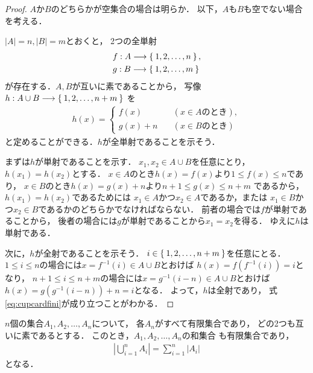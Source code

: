    \begin{proof}
     $A$か$B$のどちらかが空集合の場合は明らか．
     以下，$A$も$B$も空でない場合を考える．

     $\lvert A \rvert = n ,  \lvert B \rvert =m$とおくと，
     2つの全単射
     \begin{align*}
       & f : A \longrightarrow \Set{ 1,  2,  \ldots ,  n} ,\\
       & g : B \longrightarrow \Set{ 1,  2,  \ldots ,  m}
     \end{align*}
     が存在する．$A,B$が互いに素であることから，
     写像$h: A \cup B \longrightarrow \Set{ 1,  2,  \ldots ,  n+m} $
     を
     \begin{align*}
       h (x) = \left \{ 
         \begin{aligned}
           f(x)  \qquad & (x \in A \text{のとき} ) , \\
           g(x)+n  \quad & ( x \in B \text{のとき} )
         \end{aligned}
         \right.
     \end{align*}
     と定めることができる．$h$が全単射であることを示そう．
     
     まずは$h$が単射であることを示す．
     $x_1 , x_2 \in A \cup B$を任意にとり，$h(x_1)=h(x_2)$とする．
     $x \in A$のとき$h(x) = f(x)$より$1 \leq f(x) \leq n$であり，
     $x \in B$のとき$h(x) = g(x) + n$より$n+1 \leq g(x) \leq n+m$
     であるから，$h(x_1)=h(x_2)$であるためには
     $x_1 \in A$かつ$x_2 \in A$であるか，または
     $x_1 \in B$かつ$x_2 \in B$であるかのどちらかでなければならない．
     前者の場合では$f$が単射であることから，
     後者の場合には$g$が単射であることから$x_1=x_2$を得る．
     ゆえに$h$は単射である．

     次に，$h$が全射であることを示そう．
     $i \in \Set{ 1,2,\ldots , n+m}$を任意にとる．
     $1 \leq i \leq n $の場合には$x = f^{-1}(i) \in A \cup B$とおけば
     $h(x) = f(f^{-1}(i))=i$となり，
     $n+1 \leq i \leq n+m$の場合には$x= g^{-1}(i-n) \in A \cup B$とおけば
     $h(x) = g(g^{-1}(i-n)) + n = i$となる．
     よって，$h$は全射であり，
     式\eqref{eq:cupcardfini}が成り立つことがわかる．
   \end{proof}


   \begin{coro}
     $n$個の集合$A_1 ,  A_2,  \ldots ,  A_n$について，
     各$A_n$がすべて有限集合であり，
     どの2つも互いに素であるとする．
     このとき，$A_1 ,  A_2,  \ldots , A_n$の和集合
     も有限集合であり，
     \begin{align}
       \left \lvert \bigcup_{i=1}^{n} A_i \right \rvert
       = \sum_{i=1}^{n} \lvert A_i \rvert 
       \label{eq:unionipanfini}
     \end{align}
     となる．
   \end{coro}

